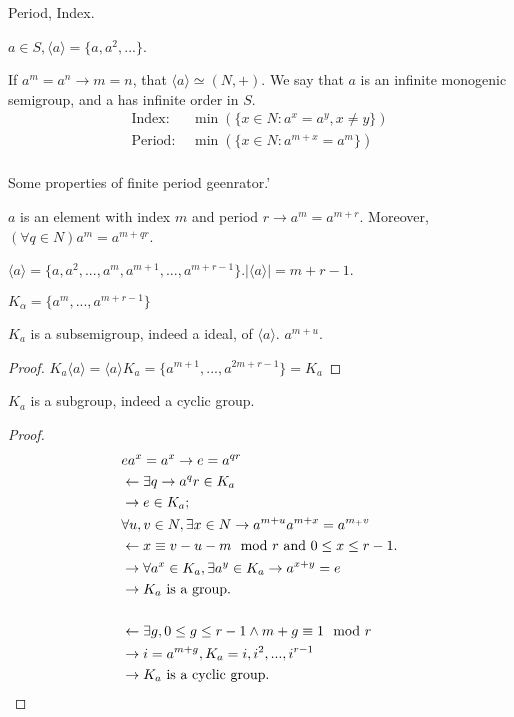 \begin{Def}Period, Index.

    $a\in S, \langle a\rangle=\{a,a^2,...\}$.

    If $a^m=a^n\rightarrow m=n$, that $\langle a\rangle \simeq (N,+)$. We say that $a$ is an infinite monogenic semigroup, and a has infinite order in $S$.
    \begin{align*}
        \text{Index: } & \min(\{x \in N: a^x=a^y,x\neq y\})   \\
        \text{Period: }& \min(\{x\in N: a^{m+x}=a^m\})  \\
    \end{align*}
\end{Def}

\begin{Exap}
    Some properties of finite period geenrator.'
    
    $a$ is an element with index $m$ and period $r \rightarrow a^m=a^{m+r}$.
    Moreover, $(\forall q \in N)a^m=a^{m+qr}$.
    
    $\langle a\rangle=\{a,a^2,...,a^m,a^{m+1},...,a^{m+r-1}\}.|\langle a\rangle|=m+r-1$.
\end{Exap}

\begin{Def}
    $K_\alpha=\{a^m,...,a^{m+r-1}\}$
\end{Def}

\begin{Prop}
    $K_a$ is a subsemigroup, indeed a ideal, of $\langle a\rangle$. $a^{m+u}$.
    \begin{proof}
        $K_a\langle a\rangle=\langle a\rangle K_a=\{a^{m+1},...,a^{2m+r-1}\}=K_a$
    \end{proof}
    $K_a$ is a subgroup, indeed a cyclic group.
    \begin{proof}
        \begin{align*}
            &ea^x=a^x \rightarrow e=a^{qr}  \\
            &\leftarrow \exists q \rightarrow a^qr \in K_a \\
            &\rightarrow e \in K_a;  \\
            &\forall u,v \in N, \exists x \in N \rightarrow a^{m+u}a^{m+x}=a^{m_+v} \\
            &\leftarrow x\equiv v-u-m\mod{r} \text{\space and } 0\leq x\leq r-1. \\
            &\rightarrow \forall a^x \in K_a, \exists a^y \in K_a \rightarrow a^{x+y}=e \\
            &\rightarrow K_a \text{ is a group}.    \\
            &\\
            &\leftarrow \exists g,0\leq g\leq r-1 \wedge m+g\equiv 1\mod{r} \\
            &\rightarrow i=a^{m+g},K_a={i,i^2,...,i^{r-1}}  \\
            &\rightarrow K_a \text{ is a cyclic group}.
        \end{align*}
    \end{proof}
\end{Prop}

